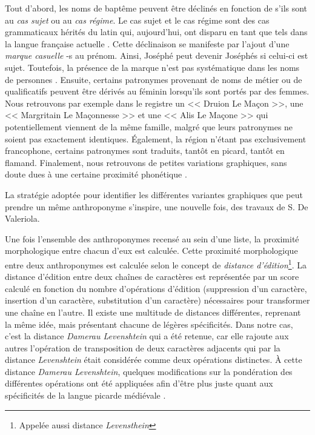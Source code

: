 Tout d'abord, les noms de baptême peuvent être déclinés en fonction de s'ils sont au \textit{cas sujet} ou au \textit{cas régime}. Le cas sujet et le cas régime sont des cas grammaticaux hérités du latin qui, aujourd'hui, ont disparu en tant que tels dans la langue française actuelle \parencite{kalm_roland_2009}.
Cette déclinaison se manifeste par l'ajout d'une \textit{marque casuelle} \og -s \fg{} au prénom. Ainsi, \og Joséphé \fg{} peut devenir \og Joséphés \fg{} si celui-ci est sujet. Toutefois, la présence de la marque n'est pas systématique dans les noms de personnes \parencite{mazziotta_marquage_2014}.
Ensuite, certains patronymes provenant de noms de métier ou de qualificatifs peuvent être dérivés au féminin lorsqu'ils sont portés par des femmes. Nous retrouvons par exemple dans le registre un << Druion Le Maçon >>, une << Margritain Le Maçonnesse >> et  une << Alis Le Maçone >> qui potentiellement viennent de la même famille, malgré que leurs patronymes ne soient pas exactement identiques. Également, la région n'étant pas exclusivement francophone, certains patronymes sont traduits, tantôt en picard, tantôt en flamand. Finalement, nous retrouvons de petites variations graphiques, sans doute dues à une certaine proximité phonétique \parencite{de_valeriola_lordinateur_2021}.

La stratégie adoptée pour identifier les différentes variantes graphiques que peut prendre un même anthroponyme s'inspire, une nouvelle fois, des travaux de S. De Valeriola.

Une fois l'ensemble des anthroponymes recensé au sein d'une liste, la proximité morphologique entre chacun d'eux est calculée. Cette proximité morphologique entre deux anthroponymes est calculée selon le concept de \textit{distance d'édition}\footnote{Appelée aussi distance \textit{Levensthein}}. 
La distance d'édition entre deux chaînes de caractères est représentée par un score calculé en fonction du nombre d'opérations d'édition (suppression d'un caractère, insertion d'un caractère, substitution d'un caractère) nécessaires pour transformer une chaîne en l'autre. Il existe une multitude de distances différentes, reprenant la même idée, mais présentant chacune de légères spécificités. 
Dans notre cas, c'est la distance \textit{Damerau Levenshtein} qui a été retenue, car elle rajoute aux autres l'opération de transposition de deux caractères adjacents qui par la distance \textit{Levenshtein} était considérée comme deux opérations distinctes. 
À cette distance \textit{Damerau Levenshtein}, quelques modifications sur la pondération des différentes opérations ont été appliquées afin d'être plus juste quant aux spécificités de la langue picarde médiévale \parencite{de_valeriola_lordinateur_2021}.

